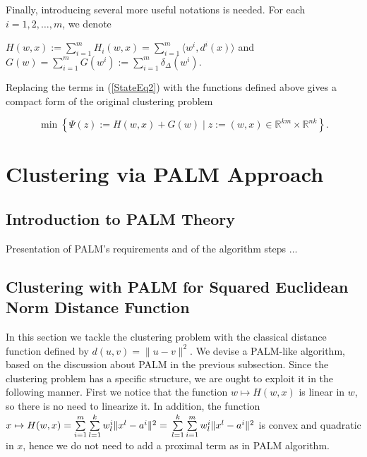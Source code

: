 \documentclass[11pt]{article}
\numberwithin{equation}{section}
\begin{document}
Finally, introducing several more useful notations is needed. For each $i=1, 2, \ldots , m$, we denote
\begin{center}
$H(w,x) := \sum\limits_{i=1}^{m} H_i(w,x) = \sum\limits_{i=1}^{m} \langle w^i , d^i(x) \rangle$ and $G(w) = \sum\limits_{i=1}^{m} G(w^i) := \sum\limits_{i=1}^{m} \delta_{\Delta}(w^i) .$
\\
\end{center}

Replacing the terms in (\ref{StateEq2}) with the functions defined above gives a compact form of the original clustering problem

\begin{equation}
	\min \left\lbrace \Psi(z) := H(w,x) + G(w) \mid z := (w,x) \in \mathbb{R}^{km} \times \mathbb{R}^{nk} \right\rbrace . \label{StateEq4}
\end{equation}


\section{Clustering via PALM Approach}

\subsection{Introduction to PALM Theory}

Presentation of PALM's requirements and of the algorithm steps  $\ldots$


\subsection{Clustering with PALM for Squared Euclidean Norm Distance Function}

In this section we tackle the clustering problem with the classical distance function defined by $d(u,v) = \|u-v\|^2$. We devise a PALM-like algorithm, based on the discussion about PALM in the previous subsection.
Since the clustering problem has a specific structure, we are ought to exploit it in the following manner.
First we notice that the function 
$w \mapsto H(w,x)$ is linear in $w$, so there is no need to linearize it. In addition, the function 
$x \mapsto H(w,x) = 
\sum\limits_{i=1}^{m} \sum\limits_{l=1}^{k} w^i_l \|x^l - a^i\|^2 =
\\ \sum\limits_{l=1}^{k} \sum\limits_{i=1}^{m} w^i_l \|x^l - a^i\|^2$ is convex and quadratic in $x$, hence we do not need to add a proximal term as in PALM algorithm.
\end{document}
